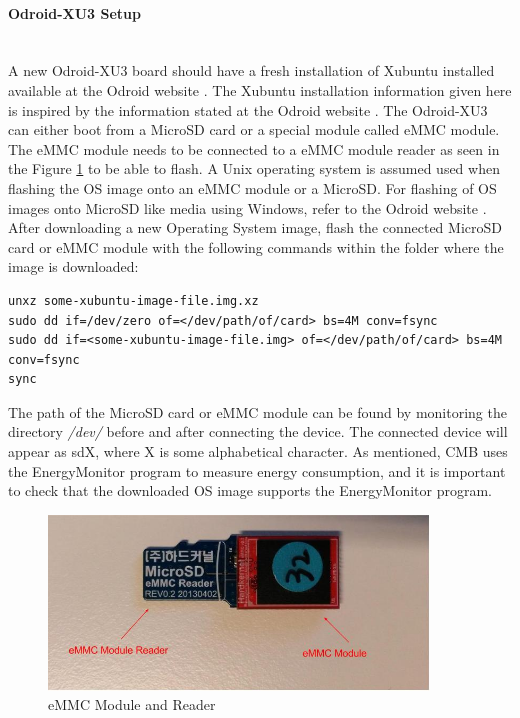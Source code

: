 \paragraph*{Odroid-XU3 Setup} \hfill \\
A new Odroid-XU3 board should have a fresh installation of Xubuntu installed available at the Odroid website \cite{m:odroid}. The Xubuntu installation information given here is inspired by the information stated at the Odroid website \cite{m:odroid-i}. The Odroid-XU3 can either boot from a MicroSD card or a special module called eMMC module. The eMMC module needs to be connected to a eMMC module reader as seen in the Figure \ref{fig:emmc} to be able to flash. A Unix operating system is assumed used when flashing the OS image onto an eMMC module or a MicroSD. For flashing of OS images onto MicroSD like media using Windows, refer to the Odroid website \cite{m:odroid}. After downloading a new Operating System image, flash the connected MicroSD card or eMMC module with the following commands within the folder where the image is downloaded:
\begin{lstlisting}
unxz some-xubuntu-image-file.img.xz
sudo dd if=/dev/zero of=</dev/path/of/card> bs=4M conv=fsync
sudo dd if=<some-xubuntu-image-file.img> of=</dev/path/of/card> bs=4M conv=fsync
sync
\end{lstlisting}
The path of the MicroSD card or eMMC module can be found by monitoring the directory \textit{/dev/} before and after connecting the device. The connected device will appear as sdX, where X is some alphabetical character. As mentioned, CMB uses the EnergyMonitor program to measure energy consumption, and it is important to check that the downloaded OS image supports the EnergyMonitor program.\\

\begin{figure}
    \centering
    \includegraphics[width=0.9\textwidth, height=0.4\textwidth]{figs/emmc.jpg}
    \caption[]{eMMC Module and Reader}
    \label{fig:emmc}
\end{figure}

